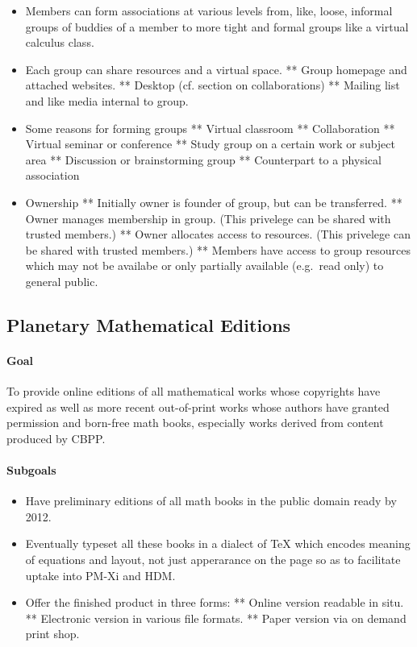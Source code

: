 \begin{itemize}
\begin{itemize}
\item
  Members can form associations at various levels from, like, loose,
  informal groups of buddies of a member to more tight and formal groups
  like a virtual calculus class.
\item
  Each group can share resources and a virtual space. ** Group homepage
  and attached websites. ** Desktop (cf. section on collaborations) **
  Mailing list and like media internal to group.
\item
  Some reasons for forming groups ** Virtual classroom ** Collaboration
  ** Virtual seminar or conference ** Study group on a certain work or
  subject area ** Discussion or brainstorming group ** Counterpart to a
  physical association
\item
  Ownership ** Initially owner is founder of group, but can be
  transferred. ** Owner manages membership in group. (This privelege can
  be shared with trusted members.) ** Owner allocates access to
  resources. (This privelege can be shared with trusted members.) **
  Members have access to group resources which may not be availabe or
  only partially available (e.g.~read only) to general public.
\end{itemize}
\subsection{Planetary Mathematical Editions}

\paragraph{Goal} To provide online editions of all mathematical works whose
copyrights have expired as well as more recent out-of-print works whose
authors have granted permission and born-free math books, especially
works derived from content produced by CBPP.

\paragraph{Subgoals}

\begin{itemize}
\item
  Have preliminary editions of all math books in the public domain ready
  by 2012.
\item
  Eventually typeset all these books in a dialect of TeX which encodes
  meaning of equations and layout, not just apperarance on the page so
  as to facilitate uptake into PM-Xi and HDM.
\item
  Offer the finished product in three forms: ** Online version readable
  in situ. ** Electronic version in various file formats. ** Paper
  version via on demand print shop.
\end{itemize}


\end{itemize}
